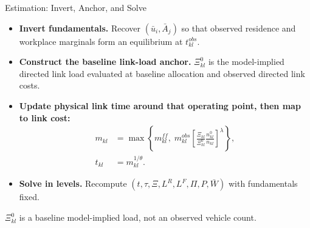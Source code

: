 \documentclass[11pt,aspectratio=169]{beamer}
\begin{document}
\begin{frame}{Estimation: Invert, Anchor, and Solve}
\begin{itemize}\small
  \item \textbf{Invert fundamentals.} Recover $(\bar u_i,\bar A_j)$ so that observed residence and workplace marginals form an equilibrium at $t_{kl}^{obs}$.
  \item \textbf{Construct the baseline link-load anchor.} $\Xi_{kl}^{0}$ is the model-implied directed link load evaluated at baseline allocation and observed directed link costs.
  \item \textbf{Update physical link time around that operating point, then map to link cost:}
  \vspace{-0.45em}\begin{equation}\label{eq:anchor}
  \begin{aligned}
    m_{kl}&=\max\!\left\{
    m_{kl}^{ff},\;
    m_{kl}^{obs}
    \left[
    \frac{\Xi_{kl}}{\Xi_{kl}^{0}}
    \frac{n_{kl}^{0}}{n_{kl}}
    \right]^{\lambda}
    \right\},\\[-0.1em]
    t_{kl}&=m_{kl}^{1/\theta}.
  \end{aligned}
  \end{equation}
  \vspace{-0.65em}
  \item \textbf{Solve in levels.} Recompute $(t,\tau,\Xi,L^R,L^F,\Pi,P,\bar W)$ with fundamentals fixed.
\end{itemize}
\vspace{-0.25em}
\begin{center}\footnotesize
$\Xi_{kl}^{0}$ is a baseline model-implied load, not an observed vehicle count.
\end{center}
\end{frame}
\end{document}
